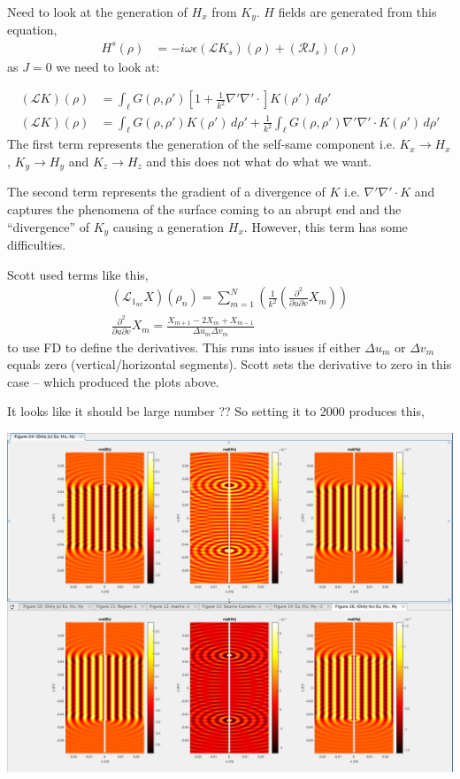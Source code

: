 \documentclass{article}
\newcommand{\0}{\varnothing}
\begin{document}
\noindent Need to look at the generation of $H_x$ from $K_y$. $H$ fields are generated from this equation,
\begin{align*}
	H^s(\rho) &= -i\omega\epsilon(\mathcal{L}K_s)(\rho) + (\mathcal{R}J_s)(\rho)
\end{align*}
as $J = 0$ we need to look at:

\begin{align*}
	(\mathcal{L}K)(\rho) &= \int_{\ell}G(\rho,\rho')[1+\frac{1}{k^2}\nabla'\nabla'\cdotp]K(\rho') \,d\rho'\\
	(\mathcal{L}K)(\rho) &= \int_{\ell}G(\rho,\rho') K(\rho') \,d\rho' + \frac{1}{k^2} \int_{\ell} G(\rho,\rho') \nabla'\nabla'\cdotp K(\rho') \,d\rho'
\end{align*}
The first term represents the generation of the self-same component i.e. $K_x \rightarrow H_x$, $K_y \rightarrow H_y$ and $K_z \rightarrow H_z$ and this does not what do what we want.

The second term represents the gradient of a divergence of $K$ i.e. $\nabla'\nabla'\cdotp K$ and captures the phenomena of the surface coming to an abrupt end and the ``divergence'' of $K_y$ causing a generation $H_x$. However, this term has some difficulties.

Scott used terms like this,
\begin{align*}
	(\mathcal{L}_{1_{uv}}X)(\rho_n) = \sum_{m=1}^{N} \left(\frac{1}{k^2}\left(
	\frac{\partial^2}{\partial u \partial v}X_{m}
	\right)\right)\\
		\frac{\partial^2}{\partial u \partial v}X_m = \frac{X_{m+1} - 2X_{m} + X_{m-1}}{\Delta u_m \Delta v_m}
\end{align*}
to use FD to define the derivatives. This runs into issues if either $\Delta u_m$ or $\Delta v_m$ equals zero (vertical/horizontal segments). Scott sets the derivative to zero in this case -- which produced the plots above. 

\newpage
It looks like it should be large number ?? So setting it to 2000 produces this,

\begin{center}
\includegraphics[width=0.55\columnwidth]{figures/Fields2000}
\end{center}
\end{document}
